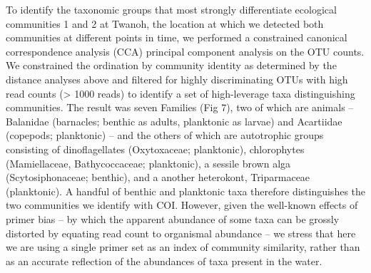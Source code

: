\documentclass[fleqn,10pt,lineno]{wlpeerj} %
\begin{document}
To identify the taxonomic groups that most strongly differentiate
ecological communities 1 and 2 at Twanoh, the location at which we
detected both communities at different points in time, we performed a
constrained canonical correspondence analysis (CCA) principal component
analysis on the OTU counts. We constrained the ordination by community
identity as determined by the distance analyses above and filtered for
highly discriminating OTUs with high read counts (\textgreater{} 1000
reads) to identify a set of high-leverage taxa distinguishing
communities. The result was seven Families (Fig 7), two of which are
animals -- Balanidae (barnacles; benthic as adults, planktonic as larvae) and Acartiidae (copepods; planktonic) -- and the others of which are autotrophic groups consisting of dinoflagellates (Oxytoxaceae; planktonic), chlorophytes (Mamiellaceae, Bathycoccaceae; planktonic), a sessile brown alga (Scytosiphonaceae; benthic), and a another heterokont, Triparmaceae (planktonic). A handful of benthic and planktonic taxa therefore distinguishes the
two communities we identify with COI. However, given the well-known
effects of primer bias -- by which the apparent abundance of some taxa
can be grossly distorted by equating read count to organismal abundance
-- we stress that here we are using a single primer set as an index of
community similarity, rather than as an accurate reflection of the
abundances of taxa present in the water.
\end{document}
